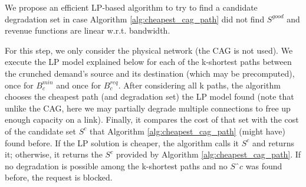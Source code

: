 \documentclass[journal]{IEEEtran}
\begin{document}
We propose an efficient LP-based algorithm to try to find a candidate degradation set in case Algorithm \ref{alg:cheapest_cag_path} did not find $S^{good}$ and revenue functions are linear w.r.t. bandwidth.



For this step, we only consider the physical network (the CAG is not used). We execute the LP model explained below for each of the k-shortest paths between the crunched demand's source and its destination (which may be precomputed), once for $B_{c}^{min}$ and once for $B_{c}^{req}$.
After considering all k paths, the algorithm chooses the cheapest path (and degradation set)  the LP model found (note that unlike the CAG, here we may partially degrade multiple connections to free up enough capacity on a link). Finally, it compares the cost of that set with the cost of the candidate set $S^c$ that Algorithm \ref{alg:cheapest_cag_path} (might have) found before. If the LP solution is cheaper, the algorithm calls it $S^c$ and returns it; otherwise, it returns the $S^c$ provided by Algorithm \ref{alg:cheapest_cag_path}. If no degradation is possible among the k-shortest paths and no $Sˆc$ was found before, the request is blocked.
\end{document}

